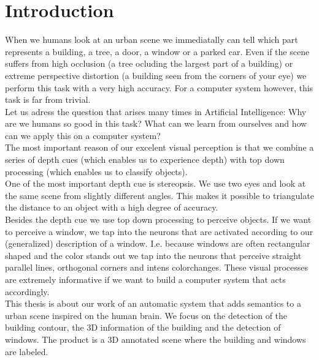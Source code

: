 \section{Introduction}
When we humans look at an urban scene we immediatally can tell which part
represents a
building, a tree, a door, a window or a parked car.
Even if the scene suffers from high occlusion (a tree ocluding the largest part
of a building) or extreme perspective distortion (a building seen from the
corners of your eye) we perform this task with a very high accuracy.
For a computer system however, this task is far from trivial.\\

Let us adress the question that arises many times in Artificial Intelligence:
Why are we humans so good in this task? What can we learn from ourselves 
and how can we apply this on a computer system?\\

The most important reason of our excelent visual perception is that we combine 
a series of depth cues (which enables us to experience depth) with top down
processing (which enables us to classify objects).\\

One of the most important depth cue is stereopsis.  We use two eyes and look at
the same scene from slightly different angles.  This makes it possible to
triangulate the distance to an object with a high degree of accuracy. \\

Besides the depth cue we use top down processing to perceive objects.  If we want
to perceive a window, we tap into the neurons that are activated according to
our (generalized) description of a window.  I.e. because windows are often
rectangular shaped and the color stands out we tap into the neurons that
perceive straight parallel lines, orthogonal corners and intens colorchanges.
These visual processes are extremely informative if we want to build a computer system
that acts accordingly.  \\

This thesis is about our work of an automatic system that adds semantics to a
urban scene inspired on the human brain. We focus on the detection of the
building contour, the 3D information of the building and the detection of
windows.  The product is a 3D annotated scene where the building and windows are labeled.\\

